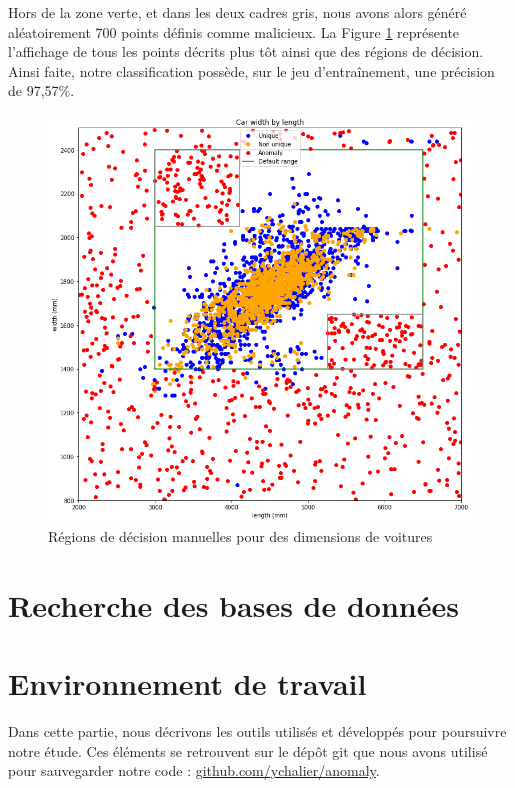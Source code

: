 \documentclass[a4paper]{report}
\begin{document}

Hors de la zone verte, et dans les deux cadres gris, nous avons alors généré aléatoirement 700 points définis comme malicieux. La Figure \ref{regions_decision_manuelles_plot} représente l'affichage de tous les points décrits plus tôt ainsi que des régions de décision. Ainsi faite, notre classification possède, sur le jeu d'entraînement, une précision de 97,57\%.

\begin{figure}
\centering
\includegraphics[width=\textwidth]{img/first_try.png}
\caption{Régions de décision manuelles pour des dimensions de voitures\label{regions_decision_manuelles_plot}}
\end{figure}

\section{Recherche des bases de données}

\section{Environnement de travail}

Dans cette partie, nous décrivons les outils utilisés et développés pour poursuivre notre étude. Ces éléments se retrouvent sur le dépôt git que nous avons utilisé pour sauvegarder notre code : \href{https://github.com/ychalier/anomaly/}{github.com/ychalier/anomaly}.
\end{document}
